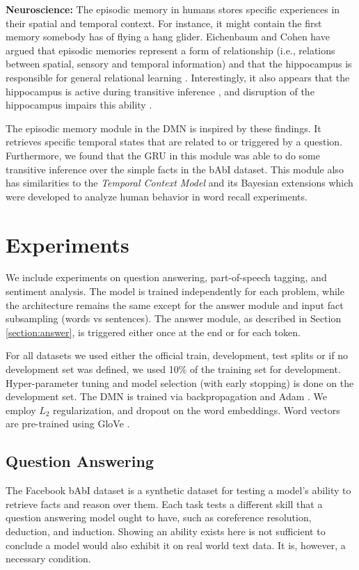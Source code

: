 \documentclass{article}
\begin{document}
\textbf{Neuroscience:}   
The episodic memory in humans stores specific experiences in their spatial and temporal context. For instance, it might contain the first memory somebody has of flying a hang glider. Eichenbaum and Cohen have argued that episodic memories represent a form of relationship  (i.e., relations between spatial, sensory and temporal information) and that the hippocampus is responsible for general relational learning \cite{Eichenbaum2004}. Interestingly, it also appears that the hippocampus is active during transitive inference \cite{Heckers2004}, and disruption of the hippocampus impairs this ability \cite{Dusek1997}. 

The episodic memory module in the DMN is inspired by these findings. It retrieves specific temporal states that are related to or triggered by a question. Furthermore, we found that the GRU in this module was able to do some transitive inference over the simple facts in the bAbI dataset.
This module also has similarities to the \emph{Temporal Context Model} \cite{Howard2002} and its Bayesian extensions \cite{Socher2009} which were developed to analyze human behavior in word recall experiments.








\section{Experiments}

We include experiments on question answering, part-of-speech tagging, and sentiment analysis. The model is trained independently for each problem, while the architecture remains the same except for the answer module and input fact subsampling (words vs sentences). The answer module, as described in Section \ref{section:answer}, is triggered either once at the end or for each token.

For all datasets we used either the official train, development, test splits or if no development set was defined, we used 10\% of the training set for development. Hyper-parameter tuning and model selection (with early stopping) is done on the development set.
The DMN is trained via backpropagation and Adam \cite{Kingma2014}. 
We employ $L_2$ regularization, and dropout on the word embeddings. Word vectors are pre-trained using GloVe \cite{Pennington2014}. 

\subsection{Question Answering}
The Facebook bAbI dataset is a synthetic dataset for testing a model's ability to retrieve facts and reason over them. Each task tests a different skill that a question answering model ought to have, such as coreference resolution, deduction, and induction. Showing an ability exists here is not sufficient to conclude a model would also exhibit it on real world text data. It is, however, a necessary condition.
\end{document}
